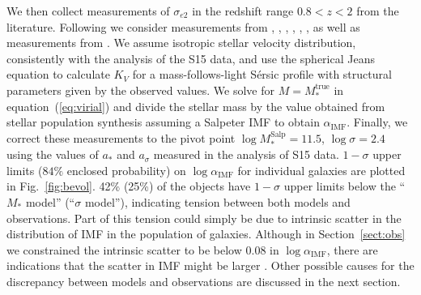 \documentclass[usenatbib]{mnras}
\def\mtrue{M_*^{\mathrm{true}}}
\def\msalp{M_*^{\mathrm{Salp}}}
\def\aimf{\alpha_{\mathrm{IMF}}}
\def\Sref#1{Section~\ref{#1}\xspace}
\def\Fref#1{Fig.~\ref{#1}\xspace}
\def\Eref#1{equation~(\ref{#1})\xspace}
\begin{document}
We then collect measurements of $\sigma_{e2}$ in the redshift range
$0.8 < z < 2$ from the literature. Following \citet{Mas++15} we
consider measurements from \citet{vdW++08}, \citet{Cap++09},
\citet{New++10}, \citet{Ono++12}, \citet{Bez++13}, \citet{vdS++13}, as
well as measurements from \citet{Gar++15}.  We assume isotropic
  stellar velocity distribution, consistently with the analysis of the
  S15 data, and use the spherical Jeans equation to calculate $K_V$
  for a mass-follows-light S\'{e}rsic \citep{Ser68} profile with structural parameters
  given by the observed values. We
solve for $M=\mtrue$ in \Eref{eq:virial} and divide the stellar mass
by the value obtained from stellar population synthesis assuming a
Salpeter IMF to obtain $\aimf$.  Finally, we correct these
measurements to the pivot point $\log{\msalp}=11.5$,
$\log{\sigma}=2.4$ using the values of $a_*$ and $a_\sigma$ measured
in the analysis of S15 data.  $1-\sigma$ upper limits ($84\%$ enclosed
probability) on $\log{\aimf}$ for individual galaxies are plotted in
\Fref{fig:bevol}.  42\% (25\%) of the objects have $1-\sigma$ upper
limits below the ``$M_*$ model'' (``$\sigma$ model''), indicating
tension between both models and observations.  Part of this tension
could simply be due to intrinsic scatter in the distribution of IMF in
the population of galaxies.  Although in \Sref{sect:obs} we
constrained the intrinsic scatter to be below $0.08$ in $\log{\aimf}$,
there are indications that the scatter in IMF might be larger 
\citep{S+L13}. 
Other possible causes for the discrepancy between models and observations are discussed in the next section.
%
\end{document}
